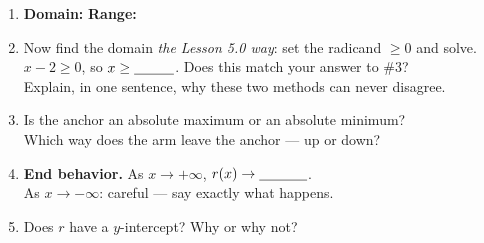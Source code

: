 \documentclass[10pt]{article}
\begin{document}
\begin{tcolorbox}[colback=white, colframe=black!40, title=\textbf{Tier R --- Remediate},
    fonttitle=\bfseries, arc=1.5mm, left=3mm, right=3mm, top=2mm, bottom=2mm, breakable]
\begin{enumerate}[leftmargin=1.7em, itemsep=7pt]
        \blank{2.0cm}.
  \item \textbf{Domain:} \blank{2.6cm} \quad \textbf{Range:} \blank{2.6cm}
  \item Now find the domain \emph{the Lesson 5.0 way}: set the radicand $\ge 0$ and solve. \\
        $x-2\ge 0$, so $x\ge\blank{1.0cm}$. \; Does this match your answer to \#3?
        \blank{1.4cm} \\
        Explain, in one sentence, why these two methods can never disagree. \blank{6.0cm}
  \item Is the anchor an absolute maximum or an absolute minimum? \blank{2.6cm} \\
        Which way does the arm leave the anchor --- up or down? \blank{1.6cm}
  \item \textbf{End behavior.} As $x\to+\infty$, $r(x)\to\blank{1.2cm}$. \\
        As $x\to-\infty$: careful --- say exactly what happens. \blank{5.4cm}
  \item Does $r$ have a $y$-intercept? \blank{1.4cm} \quad Why or why not? \blank{5.0cm}
\end{enumerate}
\end{tcolorbox}
\end{document}
